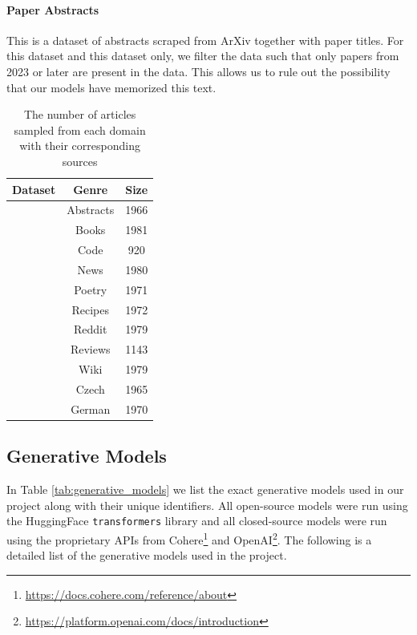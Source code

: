 \documentclass[11pt]{article}
\begin{document}
\paragraph{Paper Abstracts} \cite{arxivdataset} This is a dataset of abstracts scraped from ArXiv together with paper titles. For this dataset and this dataset only, we filter the data such that only papers from 2023 or later are present in the data. This allows us to rule out the possibility that our models have memorized this text.

\begin{table}[t]
\centering 
\small
\begin{tabular}{l|c|c} 
\toprule
\textbf{Dataset}&\textbf{Genre}&\textbf{Size}\\
\midrule
\cite{arxivdataset}&Abstracts&1966\\
\cite{bamman2013new}&Books&1981\\
\cite{raychev-etal-2016-probabilistic}&Code&920\\
\cite{greene06icml}&News&1980\\
\cite{poemsdataset}&Poetry&1971\\
\cite{bien-etal-2020-recipenlg}&Recipes&1972\\
\cite{volske-etal-2017-tl}&Reddit&1979\\
\cite{maas-etal-2011-learning}&Reviews&1143\\
\cite{aaditya_bhat_2023}&Wiki&1979\\
\cite{boháček2022finegrained}&Czech&1965\\
\cite{dietmar-etal-2017-german}&German&1970\\
\bottomrule
\end{tabular}
\caption{The number of articles sampled from each domain with their corresponding sources}
\label{tab:human_sources}
\end{table}

\subsection{Generative Models}
\label{app:models}
In Table \ref{tab:generative_models} we list the exact generative models used in our project along with their unique identifiers. All open-source models were run using the HuggingFace \texttt{transformers} library \cite{wolf2020huggingfaces} and all closed-source models were run using the proprietary APIs from Cohere\footnote{\url{https://docs.cohere.com/reference/about}} and OpenAI\footnote{\url{https://platform.openai.com/docs/introduction}}. The following is a detailed list of the generative models used in the project.
\end{document}
